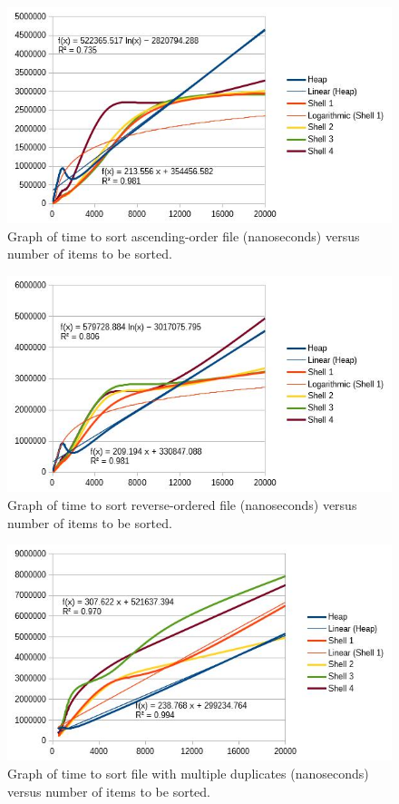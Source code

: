 \documentclass[12pt, titlepage]{article}
\begin{document}
\begin{figure} [!htbp]
	\centering
	\includegraphics[width=5in]{asc-graph}
	\caption{Graph of time to sort ascending-order file (nanoseconds) versus number of items to be sorted.}
\end{figure}

\begin{figure} [!htbp]
	\centering
	\includegraphics[width=5in]{rev-graph}
	\caption{Graph of time to sort reverse-ordered file (nanoseconds) versus number of items to be sorted.}
\end{figure}

\begin{figure} [!htbp]
	\centering
	\includegraphics[width=5in]{dup-graph}
	\caption{Graph of time to sort file with multiple duplicates (nanoseconds) versus number of items to be sorted.}
\end{figure}
\end{document}
